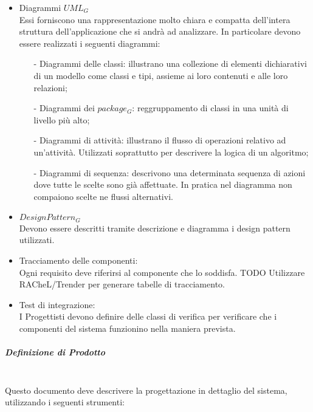 				\begin{itemize}
					\item Diagrammi $UML_G$\\
					Essi forniscono una rappresentazione molto chiara e compatta dell'intera struttura dell'applicazione che si andrà ad analizzare. In particolare devono essere realizzati i seguenti diagrammi:
					\begin{itemize}
						\item[-] Diagrammi delle classi: illustrano una collezione di elementi dichiarativi di un modello come classi e tipi, assieme ai loro contenuti e alle loro relazioni;
						\item[-] Diagrammi dei $package_G$:  reggruppamento di classi in una unità di livello più alto;
						\item[-] Diagrammi di attività: illustrano il flusso di operazioni relativo ad un'attività. Utilizzati soprattutto per descrivere la logica di un algoritmo;
						\item[-] Diagrammi di sequenza: descrivono una determinata sequenza di azioni dove tutte le scelte sono già affettuate. In pratica nel diagramma non compaiono scelte ne flussi alternativi.
					\end{itemize}
					\item $Design Pattern_G$\\
					Devono essere descritti tramite descrizione e diagramma i design pattern utilizzati.
					\item Tracciamento delle componenti:\\
					Ogni requisito deve riferirsi al componente che lo soddisfa. TODO Utilizzare RACheL/Trender  per generare tabelle di tracciamento.
					\item Test di integrazione:\\
					I Progettisti devono definire delle classi di verifica per verificare che i componenti del sistema funzionino nella maniera prevista.	
				\end{itemize}
			\subparagraph{Definizione di Prodotto}
			\mbox{}\\
			Questo documento deve descrivere la progettazione in dettaglio del sistema, utilizzando i seguenti strumenti:
